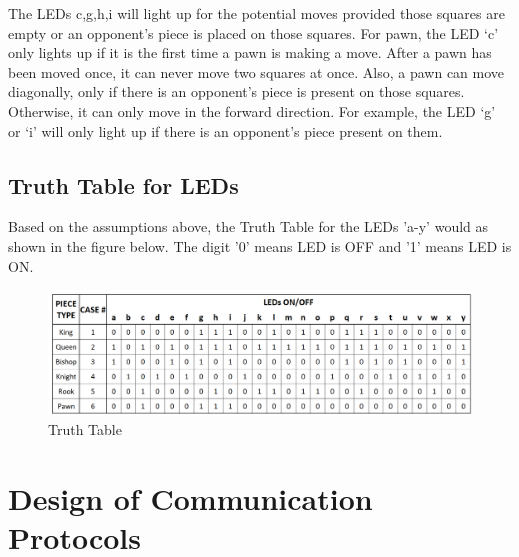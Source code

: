\documentclass[12pt, titlepage]{article}
\begin{document}
\begin{itemize}
  The LEDs c,g,h,i will light up for the potential moves provided those squares are empty or an opponent’s piece is placed on those squares. For pawn, the LED ‘c’ only 
  lights up if it is the first time a pawn is making a move. After a pawn has been moved once, it can never move two squares at once. Also, a pawn can move diagonally, 
  only if there is an opponent’s piece is present on those squares. Otherwise, it can only move in the forward direction. For example, the LED ‘g’ or ‘i’ will only light 
  up if there is an opponent’s piece present on them. 

  \end{itemize}
  


\subsection*{Truth Table for LEDs}

Based on the assumptions above, the Truth Table for the LEDs 'a-y' would as shown in the figure below. 
The digit '0' means LED is OFF and '1' means LED is ON.

\begin{figure}[h]
  \centering
  \includegraphics[width=1\textwidth]{truth_table}
  \caption{Truth Table}
\end{figure}

\section{Design of Communication Protocols}

\end{document}
